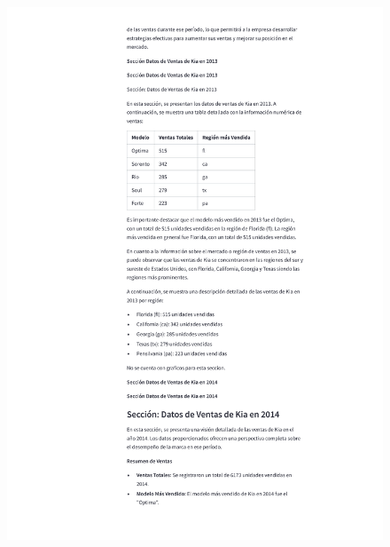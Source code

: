 \begin{anexos}
\begin{figure}
		\includegraphics[height=\textheight]{reporte/2.png}
	\end{figure}
	\begin{figure}
		\centering

\end{figure}
\end{anexos}
